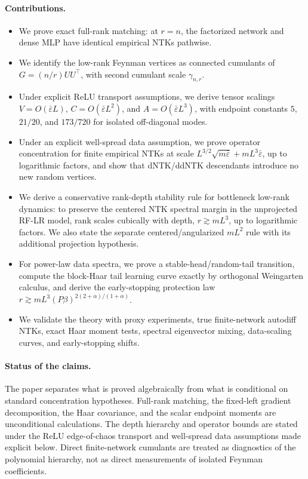 \documentclass{article}
\newcommand{\barE}{\bar\varepsilon}
\begin{document}
\paragraph{Contributions.}
\begin{itemize}[leftmargin=1.4em]
\item We prove exact full-rank matching: at \(r=n\), the factorized network and dense MLP have identical empirical NTKs pathwise.
\item We identify the low-rank Feynman vertices as connected cumulants of \(G=(n/r)UU^\top\), with second cumulant scale \(\gamma_{n,r}\).
\item Under explicit ReLU transport assumptions, we derive tensor scalings \(V=O(\barE L)\), \(C=O(\barE L^2)\), and \(A=O(\barE L^3)\), with endpoint constants \(5\), \(21/20\), and \(173/720\) for isolated off-diagonal modes.
\item Under an explicit well-spread data assumption, we prove operator concentration for finite empirical NTKs at scale \(L^{3/2}\sqrt{m\barE}+mL^3\barE\), up to logarithmic factors, and show that dNTK/ddNTK descendants introduce no new random vertices.
\item We derive a conservative rank-depth stability rule for bottleneck low-rank dynamics: to preserve the centered NTK spectral margin in the unprojected RF-LR model, rank scales cubically with depth, \(r\gtrsim mL^3\), up to logarithmic factors. We also state the separate centered/angularized \(mL^2\) rule with its additional projection hypothesis.
\item For power-law data spectra, we prove a stable-head/random-tail transition, compute the block-Haar tail learning curve exactly by orthogonal Weingarten calculus, and derive the early-stopping protection law \(r\gtrsim mL^3(P\beta)^{2(2+\alpha)/(1+\alpha)}\).
\item We validate the theory with proxy experiments, true finite-network autodiff NTKs, exact Haar moment tests, spectral eigenvector mixing, data-scaling curves, and early-stopping shifts.
\end{itemize}

\paragraph{Status of the claims.}
The paper separates what is proved algebraically from what is conditional on standard concentration hypotheses. Full-rank matching, the fixed-left gradient decomposition, the Haar covariance, and the scalar endpoint moments are unconditional calculations. The depth hierarchy and operator bounds are stated under the ReLU edge-of-chaos transport and well-spread data assumptions made explicit below. Direct finite-network cumulants are treated as diagnostics of the polynomial hierarchy, not as direct measurements of isolated Feynman coefficients.
\end{document}
